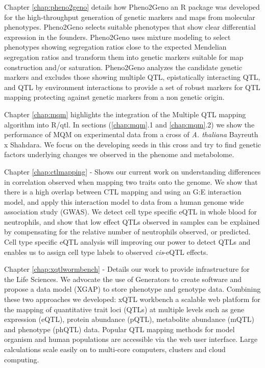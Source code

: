 Chapter \ref{chap:pheno2geno} details how Pheno2Geno an R package was developed for 
the high-throughput generation of genetic markers and maps from molecular phenotypes. 
Pheno2Geno selects suitable phenotypes that show clear differential expression in the founders. Pheno2Geno 
uses mixture modeling to select phenotypes showing segregation ratios close to the 
expected Mendelian segregation ratios and transform them into genetic markers suitable 
for map construction and/or saturation. Pheno2Geno analyzes the candidate genetic 
markers and excludes those showing multiple QTL, epistatically interacting QTL, and QTL 
by environment interactions to provide a set of robust markers for QTL mapping protecting 
against genetic markers from a non genetic origin.

Chapter \ref{chap:mqm} highlights the integration of the Multiple QTL mapping algorithm 
into R/qtl. In sections (\ref{chap:mqm}.1 and  \ref{chap:mqm}.2) we show the performance 
of MQM on experimental data from a cross of \emph{A. thaliana} Bayreuth x Shahdara. We 
focus on the developing seeds in this cross and try to find genetic factors underlying 
changes we observed in the phenome and metabolome.

Chapter \ref{chap:ctlmapping} -  Shows our current work on understanding differences in 
correlation observed when mapping two traits onto the genome. We show that there is a high 
overlap between CTL mapping and using an G:E interaction model, and apply this interaction 
model to data from a human genome wide association study (GWAS). We detect cell type specific 
eQTL in whole blood for neutrophils, and show that low effect QTLs observed in samples can be explained by 
compensating for the relative number of neutrophils observed, or predicted. Cell type specific 
eQTL analysis will improving our power to detect QTLs and enables us to assign cell type labels 
to observed \emph{cis}-eQTL effects.

Chapter \ref{chap:xqtlwormbench} - Details our work to provide infrastructure for the Life 
Sciences. We advocate the use of Generators to create software and propose a data model (XGAP) 
to store phenotype and genotype data. Combining these two approaches we developed: xQTL 
workbench a scalable web platform for the mapping of quantitative trait loci (QTLs) at 
multiple levels such as gene expression (eQTL), protein abundance (pQTL), metabolite 
abundance (mQTL) and phenotype (phQTL) data. Popular QTL mapping methods for model organism 
and human populations are accessible via the web user interface. Large calculations scale 
easily on to multi-core computers, clusters and cloud computing.

